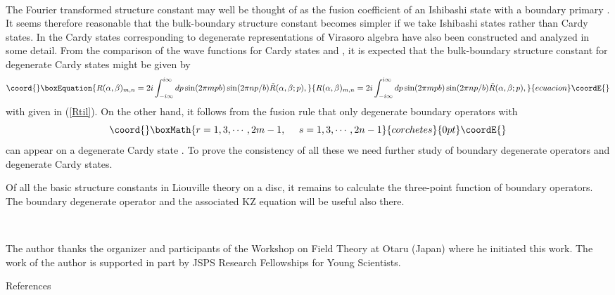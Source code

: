 \documentclass[a4paper,11pt]{article}
\providecommand{\cket}[1]{\left|{#1}\right>_{\rm \!c}}
\providecommand{\iket}[1]{|{#1}\rangle\!\rangle}
\begin{document}
~

   The Fourier transformed structure constant \coordHE{}
 may well be thought of as the fusion coefficient of an Ishibashi state
 \myHighlight{$\iket{p}$}\coordHE{} with a boundary primary \coordHE{}.
 It seems therefore reasonable that the bulk-boundary structure constant
 becomes simpler if we take Ishibashi states rather than Cardy states.
 In \cite{ZZ} the Cardy states \myHighlight{$\cket{m,n}$}\coordHE{} corresponding to degenerate
 representations of Virasoro algebra have also been constructed
 and analyzed in some detail.
 From the comparison of the wave functions for Cardy states
 \myHighlight{$\cket{s}$}\coordHE{} and \myHighlight{$\cket{m,n}$}\coordHE{}, it is expected that the bulk-boundary
 structure constant for degenerate Cardy states might be given by
\begin{equation}\coord{}\boxEquation{
  R(\alpha,\beta)_{m,n} = 2i\int_{-i\infty}^{i\infty}dp
  \sin(2\pi mpb)\sin(2\pi np/b)\tilde{R}(\alpha,\beta;p),
}{
  R(\alpha,\beta)_{m,n} = 2i\int_{-i\infty}^{i\infty}dp
  \sin(2\pi mpb)\sin(2\pi np/b)\tilde{R}(\alpha,\beta;p),
}{ecuacion}\coordE{}\end{equation}
 with \coordHE{} given in (\ref{Rtil}).
 On the other hand, it follows from the fusion rule that only
 degenerate boundary operators \coordHE{} with
\[\coord{}\boxMath{
 r=1,3,\cdots, 2m-1,~~~~ s=1,3,\cdots, 2n-1
}{corchetes}{0pt}\coordE{}\]
 can appear on a degenerate Cardy state \myHighlight{$\cket{m,n}$}\coordHE{}.
 To prove the consistency of all these we need further study of
 boundary degenerate operators and degenerate Cardy states.

   Of all the basic structure constants in Liouville theory on a disc,
 it remains to calculate the three-point function of boundary operators.
   The boundary degenerate operator \coordHE{} and the associated
 KZ equation will be useful also there.

~

   The author thanks the organizer and participants of the Workshop
 on Field Theory at Otaru (Japan) where he initiated this work.
 The work of the author is supported in part by JSPS Research
 Fellowships for Young Scientists. 

\vskip15mm

\begin{center}{\sc References}\end{center}\par
\end{document}
